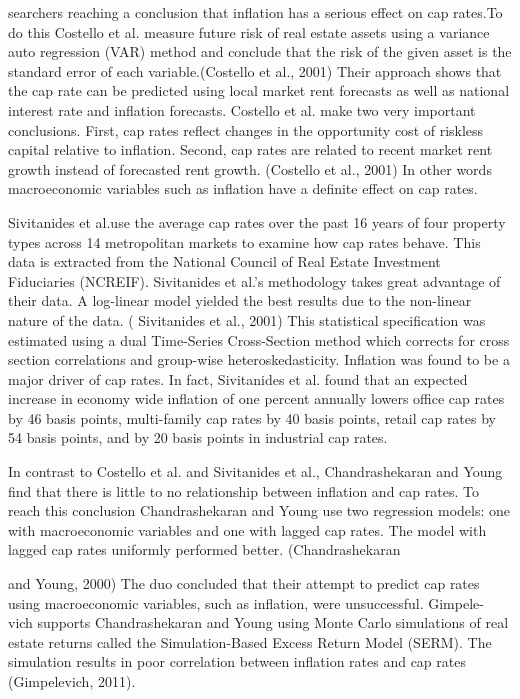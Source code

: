 searchers reaching a conclusion that inflation has a serious effect on cap rates.To do this Costello et al. measure future risk of real estate assets using a variance auto regression (VAR) method and conclude that the risk of the given asset is the standard error of each variable.(Costello et al., 2001) Their approach shows that the cap rate can be predicted using local market rent forecasts as well as national interest rate and inflation forecasts. Costello et al. make two very important conclusions. First, cap rates reflect changes in the opportunity cost of riskless capital relative to inflation. Second, cap rates are related to recent market rent growth instead of forecasted rent growth. (Costello et al., 2001) In other words macroeconomic variables such as inflation have a definite effect on cap rates.

Sivitanides et al.use the average cap rates over the past 16 years of four property types across 14 metropolitan markets to examine how cap rates behave. This data is extracted from the National Council of Real Estate Investment Fiduciaries (NCREIF). Sivitanides et al.’s methodology takes great advantage of their data. A log-linear model yielded the best results due to the non-linear nature of the data. ( Sivitanides et al., 2001) This statistical specification was estimated using a dual Time-Series Cross-Section method which corrects for cross section correlations and group-wise heteroskedasticity. Inflation was found to be a major driver of cap rates. In fact, Sivitanides et al. found that an expected increase in economy wide inflation of one percent annually lowers office cap rates by 46 basis points, multi-family cap rates by 40 basis points, retail cap rates by 54 basis points, and by 20 basis points in industrial cap rates.

In contrast to Costello et al. and Sivitanides et al., Chandrashekaran and Young find that there is little to no relationship between inflation and cap rates. To reach this conclusion Chandrashekaran and Young use two regression models: one with macroeconomic variables and one with lagged cap rates. The model with lagged cap rates uniformly performed better. (Chandrashekaran
 



and Young, 2000) The duo concluded that their attempt to predict cap rates using macroeconomic variables, such as inflation, were unsuccessful. Gimpele- vich supports Chandrashekaran and Young using Monte Carlo simulations of real estate returns called the Simulation-Based Excess Return Model (SERM). The simulation results in poor correlation between inflation rates and cap rates (Gimpelevich, 2011).

